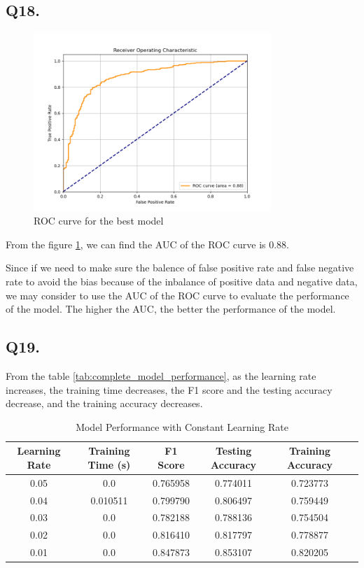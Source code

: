 \documentclass{article}
\begin{document}


\subsection*{Q18.}

\begin{figure}[h!]
    \centering
    \includegraphics[width=0.8\textwidth]{./pic/ROC_curve_set7.png}
    \caption{ROC curve for the best model}
    \label{fig:ROC}
\end{figure}

From the figure \ref{fig:ROC}, we can find the AUC of the ROC curve is 0.88. 

Since if we need to make sure the balence of false positive rate and false negative rate to avoid the bias because of the inbalance of positive data and negative data, we may consider to use the AUC of the ROC curve to evaluate the performance of the model. The higher the AUC, the better the performance of the model.


    
\subsection*{Q19.}

From the table \ref{tab:complete_model_performance}, as the learning rate increases, the training time decreases, the F1 score and the testing accuracy decrease, and the training accuracy decreases.

\begin{table}[htbp]
    \centering
    \begin{tabular}{cccccc}
    \toprule
    Learning Rate & Training Time (s) & F1 Score & Testing Accuracy & Training Accuracy \\
    \midrule
    0.05 & 0.0 & 0.765958 & 0.774011 & 0.723773 \\
    0.04 & 0.010511 & 0.799790 & 0.806497 & 0.759449 \\
    0.03 & 0.0 & 0.782188 & 0.788136 & 0.754504 \\
    0.02 & 0.0 & 0.816410 & 0.817797 & 0.778877 \\
    0.01 & 0.0 & 0.847873 & 0.853107 & 0.820205 \\
    \bottomrule
    \end{tabular}
    \caption{Model Performance with Constant Learning Rate}
    \label{tab:model_performance_constant_lr}
\end{table}
\end{document}
